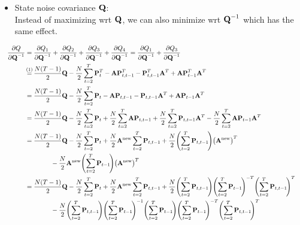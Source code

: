 		\begin{itemize}
			\item State noise covariance \(\boldsymbol{\mathrm{Q}}\): \\ Instead of maximizing \ac{wrt} \(\boldsymbol{\mathrm{Q}}\), we can also minimize \ac{wrt} \(\boldsymbol{\mathrm{Q}}^{-1}\) which has the same effect.
		\end{itemize}
		\begin{align}
			&&\pdv{Q}{\mat{Q}^{-1}}
				&= \pdv{Q_1}{\mat{Q}^{-1}} + \pdv{Q_2}{\mat{Q}^{-1}} + \pdv{Q_3}{\mat{Q}^{-1}} + \pdv{Q_4}{\mat{Q}^{-1}} = \pdv{Q_1}{\mat{Q}^{-1}} + \pdv{Q_3}{\mat{Q}^{-1}} & \nonumber \\
			&&	&\oversetfootnotemark{=} \frac{N(T - 1)}{2} \mat{Q} - \frac{N}{2} \sum_{t = 2}^{T} \mat{P}_t^T - \mat{A} \mat{P}_{t, t - 1}^T - \mat{P}_{t, t - 1}^T \mat{A}^T + \mat{A} \mat{P}_{t - 1}^T \mat{A}^T & \nonumber \\
			&&	&= \frac{N(T - 1)}{2} \mat{Q} - \frac{N}{2} \sum_{t = 2}^{T} \mat{P}_t - \mat{A} \mat{P}_{t, t - 1} - \mat{P}_{t, t - 1} \mat{A}^T + \mat{A} \mat{P}_{t - 1} \mat{A}^T & \nonumber \\
			&&	&= \frac{N(T - 1)}{2} \mat{Q} - \frac{N}{2} \sum_{t = 2}^{T} \mat{P}_t + \frac{N}{2} \sum_{t = 2}^{T} \mat{A} \mat{P}_{t, t - 1} + \frac{N}{2} \sum_{t = 2}^{T} \mat{P}_{t, t - 1} \mat{A}^T - \frac{N}{2} \sum_{t = 2}^{T} \mat{A} \mat{P}_{t - 1} \mat{A}^T & \nonumber \\
			&&	&= \frac{N(T - 1)}{2} \mat{Q} - \frac{N}{2} \sum_{t = 2}^{T} \mat{P}_t + \frac{N}{2} \mat{A}^\new \sum_{t = 2}^{T} \mat{P}_{t, t - 1} + \frac{N}{2} \Bigg(\! \sum_{t = 2}^{T} \mat{P}_{t, t - 1} \!\Bigg) \big(\mat{A}^\new\big)^T & \nonumber \\
			&&	&\qquad\qquad - \frac{N}{2} \mat{A}^\new \Bigg(\! \sum_{t = 2}^{T} \mat{P}_{t - 1} \!\Bigg) \big(\mat{A}^\new\big)^T & \nonumber \\
			&&	&= \frac{N(T - 1)}{2} \mat{Q} - \frac{N}{2} \sum_{t = 2}^{T} \mat{P}_t + \frac{N}{2} \mat{A}^\new \sum_{t = 2}^{T} \mat{P}_{t, t - 1} + \frac{N}{2} \Bigg(\! \sum_{t = 2}^{T} \mat{P}_{t, t - 1} \!\Bigg) \Bigg(\! \sum_{t = 2}^{T} \mat{P}_{t - 1} \!\Bigg)^{-T} \Bigg(\! \sum_{t = 2}^{T} \mat{P}_{t, t - 1} \!\Bigg)^T & \nonumber \\
			&&	&\qquad\qquad - \frac{N}{2} \Bigg(\! \sum_{t = 2}^{T} \mat{P}_{t, t - 1} \!\Bigg) \Bigg(\! \sum_{t = 2}^{T} \mat{P}_{t - 1} \!\Bigg)^{-1} \Bigg(\! \sum_{t = 2}^{T} \mat{P}_{t - 1} \!\Bigg) \Bigg(\! \sum_{t = 2}^{T} \mat{P}_{t - 1} \!\Bigg)^{-T} \Bigg(\! \sum_{t = 2}^{T} \mat{P}_{t, t - 1} \!\Bigg)^T & \nonumber \\

\end{align}
